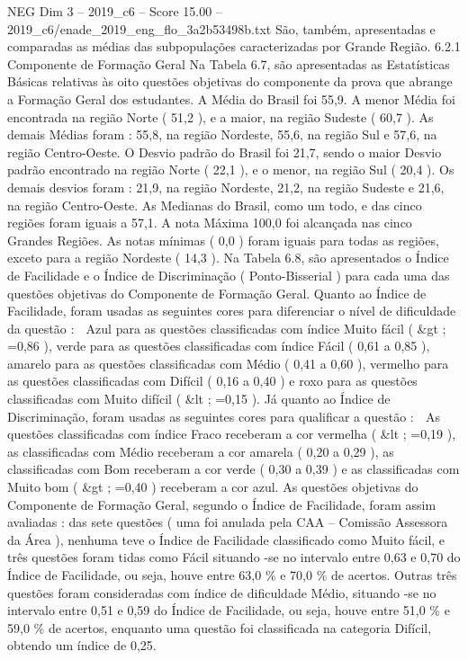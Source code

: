 \begin{textsample}{NEG Dim 3 – 2019\_c6 – Score 15.00 – 2019\_c6/enade\_2019\_eng\_flo\_3a2b53498b.txt}
São, também, apresentadas e comparadas as médias das subpopulações caracterizadas por Grande Região. 6.2.1 Componente de Formação Geral Na Tabela 6.7, são apresentadas as Estatísticas Básicas relativas às oito questões objetivas do componente da prova que abrange a Formação Geral dos estudantes.
A Média do Brasil foi 55,9.
A menor Média foi encontrada na região Norte ( 51,2 ), e a maior, na região Sudeste ( 60,7 ).
As demais Médias foram : 55,8, na região Nordeste, 55,6, na região Sul e 57,6, na região Centro-Oeste.
O Desvio padrão do Brasil foi 21,7, sendo o maior Desvio padrão encontrado na região Norte ( 22,1 ), e o menor, na região Sul ( 20,4 ).
Os demais desvios foram : 21,9, na região Nordeste, 21,2, na região Sudeste e 21,6, na região Centro-Oeste.
As Medianas do Brasil, como um todo, e das cinco regiões foram iguais a 57,1.
A nota Máxima 100,0 foi alcançada nas cinco Grandes Regiões.
As notas mínimas ( 0,0 ) foram iguais para todas as regiões, exceto para a região Nordeste ( 14,3 ).
Na Tabela 6.8, são apresentados o Índice de Facilidade e o Índice de Discriminação ( Ponto-Bisserial ) para cada uma das questões objetivas do Componente de Formação Geral.
Quanto ao Índice de Facilidade, foram usadas as seguintes cores para diferenciar o nível de dificuldade da questão :  Azul para as questões classificadas com índice Muito fácil ( \&gt ; =0,86 ), verde para as questões classificadas com índice Fácil ( 0,61 a 0,85 ), amarelo para as questões classificadas com Médio ( 0,41 a 0,60 ), vermelho para as questões classificadas com Difícil ( 0,16 a 0,40 ) e roxo para as questões classificadas com Muito difícil ( \&lt ; =0,15 ).
Já quanto ao Índice de Discriminação, foram usadas as seguintes cores para qualificar a questão :  As questões classificadas com índice Fraco receberam a cor vermelha ( \&lt ; =0,19 ), as classificadas com Médio receberam a cor amarela ( 0,20 a 0,29 ), as classificadas com Bom receberam a cor verde ( 0,30 a 0,39 ) e as classificadas com Muito bom ( \&gt ; =0,40 ) receberam a cor azul.
As questões objetivas do Componente de Formação Geral, segundo o Índice de Facilidade, foram assim avaliadas : das sete questões ( uma foi anulada pela CAA – Comissão Assessora da Área ), nenhuma teve o Índice de Facilidade classificado como Muito fácil, e três questões foram tidas como Fácil situando -se no intervalo entre 0,63 e 0,70 do Índice de Facilidade, ou seja, houve entre 63,0 \% e 70,0 \% de acertos.
Outras três questões foram consideradas com índice de dificuldade Médio, situando -se no intervalo entre 0,51 e 0,59 do Índice de Facilidade, ou seja, houve entre 51,0 \% e 59,0 \% de acertos, enquanto uma questão foi classificada na categoria Difícil, obtendo um índice de 0,25.

\end{textsample}
